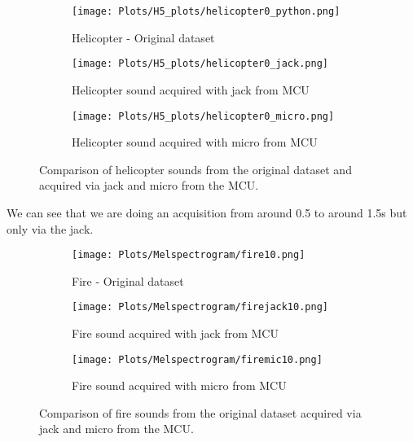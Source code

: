 \documentclass{article}
\begin{document}
\begin{figure}[H]
    \centering
    \begin{subfigure}{0.35\linewidth} %
        \centering
        \texttt{[image: Plots/H5\_plots/helicopter0\_python.png]}
        \caption{Helicopter - Original dataset}
    \end{subfigure}
    \hfill
    \begin{subfigure}{0.27\linewidth} %
        \centering
        \texttt{[image: Plots/H5\_plots/helicopter0\_jack.png]}
        \caption{Helicopter sound acquired with jack from MCU}
    \end{subfigure}
    \hfill
    \begin{subfigure}{0.27\linewidth} %
        \centering
        \texttt{[image: Plots/H5\_plots/helicopter0\_micro.png]}
        \caption{Helicopter sound acquired with micro from MCU}
    \end{subfigure}
    \caption{Comparison of helicopter sounds from the original dataset and acquired via jack and micro from the MCU.}
\end{figure}
We can see that we are doing an acquisition from around 0.5 to around 1.5s but only via the jack.
\begin{figure}[H]
    \centering
    \begin{subfigure}{0.35\linewidth} %
        \centering
        \texttt{[image: Plots/Melspectrogram/fire10.png]}
        \caption{Fire - Original dataset}
    \end{subfigure}
    \hfill
    \begin{subfigure}{0.27\linewidth} %
        \centering
        \texttt{[image: Plots/Melspectrogram/firejack10.png]}
        \caption{Fire sound acquired with jack from MCU}
    \end{subfigure}
    \hfill
    \begin{subfigure}{0.27\linewidth} %
        \centering
        \texttt{[image: Plots/Melspectrogram/firemic10.png]}
        \caption{Fire sound acquired with micro from MCU}
    \end{subfigure}
    \caption{Comparison of fire sounds from the original dataset acquired via jack and micro from the MCU.}
\end{figure}
\end{document}
